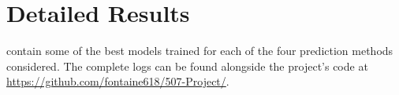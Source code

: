 \documentclass[bj, preprint]{imsart}
\begin{document}
\clearpage
\newpage
\section{Detailed Results}\label{sec:res}
 contain some of the best models trained for each of the four prediction methods considered. The complete logs can be found alongside the project's code at \url{https://github.com/fontaine618/507-Project/}.





\end{document}
